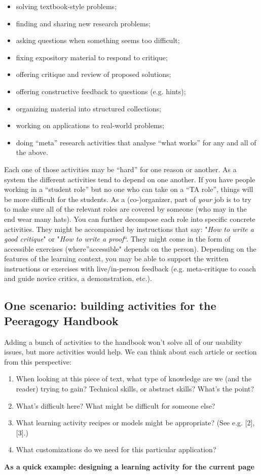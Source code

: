 \begin{itemize}
\item
  solving textbook-style problems;
\item
  finding and sharing new research problems;
\item
  asking questions when something seems too difficult;
\item
  fixing expository material to respond to critique;
\item
  offering critique and review of proposed solutions;
\item
  offering constructive feedback to questions (e.g. hints);
\item
  organizing material into structured collections;
\item
  working on applications to real-world problems;
\item
  doing ``meta'' research activities that analyse ``what works'' for any
  and all of the above.
\end{itemize}
Each one of those activities may be ``hard'' for one reason or another.
As a system the different activities tend to depend on one another. If
you have people working in a ``student role'' but no one who can take on
a ``TA role'', things will be more difficult for the students. As a
(co-)organizer, part of \emph{your} job is to try to make sure all of
the relevant roles are covered by someone (who may in the end wear many
hats). You can further decompose each role into specific concrete
activities. They might be accompanied by instructions that say:
"\emph{How to write a good critique}" or "\emph{How to write a proof}``.
They might come in the form of accessible exercises (where''accessible"
depends on the person). Depending on the features of the learning
context, you may be able to support the written instructions or
exercises with live/in-person feedback (e.g. meta-critique to coach and
guide novice critics, a demonstration, etc.).

\subsection{One scenario: building activities for the Peeragogy
Handbook}

Adding a bunch of activities to the handbook won't solve all of our
usability issues, but more activities would help. We can think about
each article or section from this perspective:

\begin{enumerate}
\item
  When looking at this piece of text, what type of knowledge are we (and
  the reader) trying to gain? Technical skills, or abstract skills?
  What's the point?
\item
  What's difficult here? What might be difficult for someone else?
\item
  What learning activity recipes or models might be appropriate? (See
  e.g. {[}2{]}, {[}3{]}.)
\item
  What customizations do we need for this particular application?
\end{enumerate}
\textbf{\emph{}As a quick example: designing a learning activity for the
current page}

